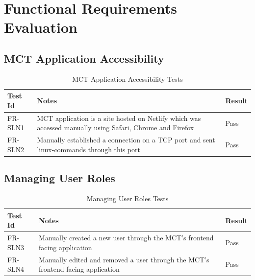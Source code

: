 \documentclass[12pt, titlepage]{article}
\begin{document}
\newpage

\tableofcontents

\listoftables %

\listoffigures %

\newpage


\section{Functional Requirements Evaluation}

\subsection{MCT Application Accessibility}

\begin{center}
\begin{longtable}{|p{2cm} | p{8cm} |p{2cm}| }
\caption{MCT Application Accessibility Tests}
\hline
\textbf{Test Id} & \textbf{Notes} & \textbf{Result} \\
\hline
FR-SLN1 & MCT application is a site hosted on Netlify which was accessed manually using Safari, Chrome and Firefox & Pass \\
\hline
FR-SLN2 & Manually established a connection on a TCP port and sent linux-commands through this port & Pass \\
\hline

\end{longtable}
\end{center}

\subsection{Managing User Roles}

\begin{center}
\begin{longtable}{|p{2cm} | p{8cm} |p{2cm}| }
\caption{Managing User Roles Tests}
\hline
\textbf{Test Id} & \textbf{Notes} & \textbf{Result} \\
\hline
FR-SLN3 & Manually created a new user through the MCT's frontend facing application & Pass \\
\hline
FR-SLN4 & Manually edited and removed a user through the MCT's frontend facing application & Pass \\
\hline

\end{longtable}
\end{center}
\end{document}
